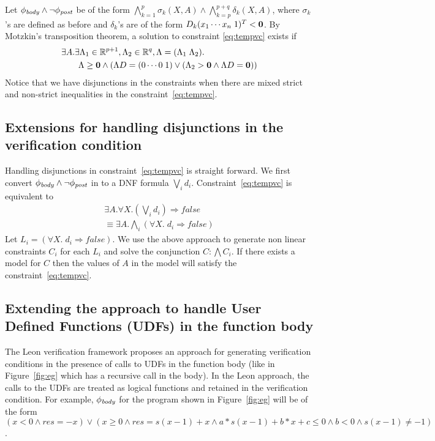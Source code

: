\documentclass[a4paper,10pt]{article}
\begin{document}
Let $\mathit{\phi_{body}} \wedge \neg \mathit{\phi_{post}}$ be of the form 
$\bigwedge \limits_{k=1}^{p} \sigma_k(X,A) \wedge \bigwedge \limits_{k=p}^{p+q} \delta_k(X,A)$,
where $\sigma_k$'s are defined as before and $\delta_k$'s are of the form 
$D_k (x_1 \cdots x_n \; 1)^T < \mathbf{0}$.
By Motzkin's transposition theorem, a solution to constraint \ref{eq:tempvc} exists if
%
\begin{align}
& \nonumber
\exists A. \exists \Lambda_1 \in \mathbb{R}^{p+1}, \Lambda_2 \in \mathbb{R}^{q}, \Lambda = (\Lambda_1 \; \Lambda_2). \; \\ 
& \qquad \Lambda \ge \mathbf{0} \wedge (\Lambda D =(0 \cdots 0 \; 1) \vee (\Lambda_2 > \mathbf{0} \wedge \Lambda D = \mathbf{0})) \label{eq:motlemma}
\end{align}
%
Notice that we have disjunctions in the constraints when there are mixed strict and non-strict inequalities in the constraint~\ref{eq:tempvc}. 

\subsection{Extensions for handling disjunctions in the verification condition}

Handling disjunctions in constraint~\ref{eq:tempvc} is straight forward. We first
convert $\mathit{\phi_{body}} \wedge \neg \mathit{\phi_{post}}$ in to a DNF formula $\bigvee_i d_i$.
Constraint~\ref{eq:tempvc} is equivalent to 
%
\begin{align}
\exists A. \forall X. (\bigvee_i d_i) \Rightarrow false \\
\equiv \exists A. \bigwedge_i (\forall X. \; d_i \Rightarrow false)
\end{align}
%
Let $L_i =  (\forall X. \; d_i \Rightarrow false)$. We use the above approach to generate non linear constraints $C_i$ for each $L_i$ and solve the conjunction $C: \bigwedge C_i$.
If there exists a model for $C$ then the values of $A$ in the model will satisfy the 
constraint~\ref{eq:tempvc}.

\subsection{Extending the approach to handle User Defined Functions (UDFs) in the function body}

The Leon verification framework proposes an approach for generating verification conditions in the presence of calls to UDFs in the function body (like in Figure~\ref{fig:eg} which has a recursive call in the body). In the Leon approach, the calls to the UDFs are treated as logical functions and retained in the verification condition. For example, $\mathit{\phi_{body}}$ for the program shown in Figure~\ref{fig:eg} will  be of the form 
$(x < 0 \wedge res = -x) \vee (x \ge 0 \wedge res = s(x-1) + x \wedge a*s(x-1) + b*x + c \le 0 \wedge b < 0 \wedge s(x-1) \ne -1)$.
\end{document}
